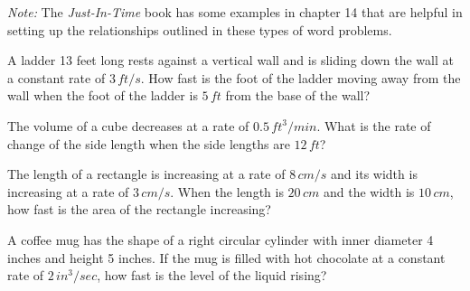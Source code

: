 \documentclass[answers]{exam}
\begin{document}
\pagebreak
\begin{center}
\end{center}

\textit{Note:} The \textit{Just-In-Time} book has some examples in chapter 14 that are helpful in setting up the relationships outlined in these types of word problems.
\pagebreak

\begin{ex*}
  A ladder 13 feet long rests against a vertical wall and is sliding down the wall at a constant rate of $3\,ft/s$. How fast is the foot of the ladder moving away from the wall when the foot of the ladder is $5\,ft$ from the base of the wall?
\end{ex*}
\pagebreak

\begin{ex*}
  The volume of a cube decreases at a rate of $0.5\,ft^3/min$. What is the rate of change of the side length when the side lengths are $12\,ft$?
\end{ex*}
\pagebreak

\begin{ex*}
  The length of a rectangle is increasing at a rate of $8\,cm/s$ and its width is increasing at a rate of $3\,cm/s$. When the length is $20\,cm$ and the width is $10\,cm$, how fast is the area of the rectangle increasing?
\end{ex*}
\pagebreak

\begin{ex*}
  A coffee mug has the shape of a right circular cylinder with inner diameter 4 inches and height 5 inches. If the mug is filled with hot chocolate at a constant rate of $2\,in^3/sec$, how fast is the level of the liquid rising?
\end{ex*}
\pagebreak
\end{document}
